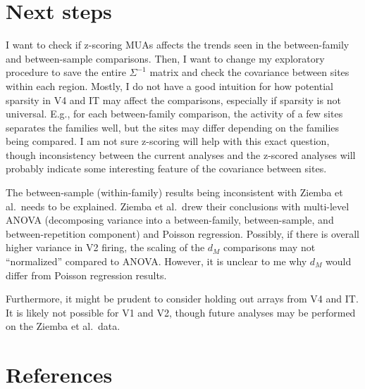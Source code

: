 \documentclass[
  11pt,
  letterpaper,
  DIV=11,
  numbers=noendperiod]{scrartcl}
\begin{document}
\section{Next steps}\label{next-steps}

I want to check if z-scoring MUAs affects the trends seen in the
between-family and between-sample comparisons. Then, I want to change my
exploratory procedure to save the entire \(\Sigma^{-1}\) matrix and
check the covariance between sites within each region. Mostly, I do not
have a good intuition for how potential sparsity in V4 and IT may affect
the comparisons, especially if sparsity is not universal. E.g., for each
between-family comparison, the activity of a few sites separates the
families well, but the sites may differ depending on the families being
compared. I am not sure z-scoring will help with this exact question,
though inconsistency between the current analyses and the z-scored
analyses will probably indicate some interesting feature of the
covariance between sites.

The between-sample (within-family) results being inconsistent with
Ziemba et al.~needs to be explained. Ziemba et al.~drew their
conclusions with multi-level ANOVA (decomposing variance into a
between-family, between-sample, and between-repetition component) and
Poisson regression. Possibly, if there is overall higher variance in V2
firing, the scaling of the \(d_M\) comparisons may not ``normalized''
compared to ANOVA. However, it is unclear to me why \(d_M\) would differ
from Poisson regression results.

Furthermore, it might be prudent to consider holding out arrays from V4
and IT. It is likely not possible for V1 and V2, though future analyses
may be performed on the Ziemba et al.~data.

\section{References}\label{references}
\end{document}
